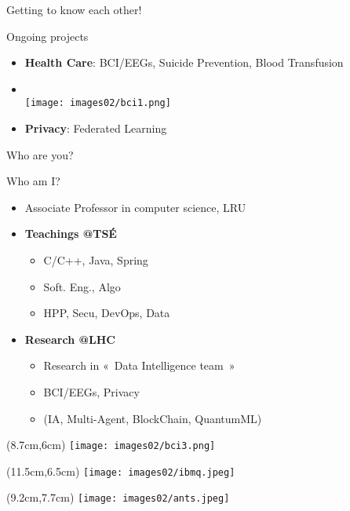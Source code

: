 \documentclass[English,t,%
hyperref={%
    pdftitle={GM's Introduction},%
    pdfauthor={Guillaume Muller},%
    pdfsubject={GM's Introduction},%
    pdfkeywords={Presentation, Introduction}%
    },%
xcolor={pdftex,svgnames} %
]{beamer}
\begin{document}
\begin{frame}{Getting to know each other!}
  \begin{block}{Ongoing projects}
    { \footnotesize
      \begin{itemize}
        \item \textbf{Health Care}: BCI/EEGs, Suicide Prevention, Blood Transfusion
        \item[]~\\[-1cm] \hfill \texttt{[image: images02/bci1.png]}
        \item \textbf{Privacy}: Federated Learning
      \end{itemize}
      }
  \end{block}

\end{frame}




\begin{frame}{Who are you?}

\end{frame}


\begin{frame}{Who am I?}

  \begin{itemize}
%
    \item Associate Professor in computer science, LRU
%
    \vspace{2em}
    \item \textbf{Teachings @TSÉ}
    \vspace{.5em}
    \begin{itemize}
      \item C/C++, Java, Spring
      \item Soft. Eng., Algo
      \item HPP, Secu, DevOps, Data
    \end{itemize}
%
    \vspace{2em}
    \item \textbf{Research @LHC}
    \vspace{.5em}
    \begin{itemize}
      \item Research in «~Data Intelligence team~»
      \item BCI/EEGs, Privacy
      \item (IA, Multi-Agent, BlockChain, QuantumML)
    \end{itemize}
%
  \end{itemize}

\begin{textblock*}{2cm}(8.7cm,6cm)%
  \texttt{[image: images02/bci3.png]}
\end{textblock*}%

\begin{textblock*}{2cm}(11.5cm,6.5cm)%
  \texttt{[image: images02/ibmq.jpeg]}
\end{textblock*}%

\begin{textblock*}{2cm}(9.2cm,7.7cm)%
  \texttt{[image: images02/ants.jpeg]}
\end{textblock*}%

\end{frame}
\end{document}
